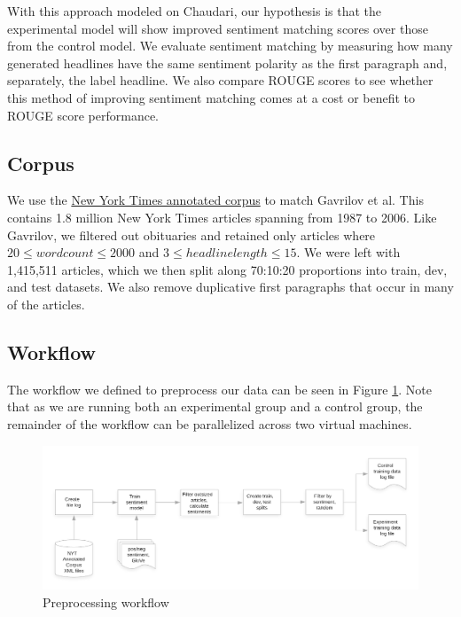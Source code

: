 \documentclass[11pt]{article}
\begin{document}
With this approach modeled on Chaudari\cite{DBLP:journals/corr/abs-1802-09426}, our hypothesis is that the experimental model will show improved sentiment matching scores over those from the control model. We evaluate sentiment matching by measuring how many generated headlines have the same sentiment polarity as the first paragraph and, separately, the label headline. We also compare ROUGE scores to see whether this method of improving sentiment matching comes at a cost or benefit to ROUGE score performance.

\subsection{Corpus}
We use the \href{https://catalog.ldc.upenn.edu/LDC2008T19}{New York Times annotated corpus} to match Gavrilov et al. This contains 1.8 million New York Times articles spanning from 1987 to 2006. Like Gavrilov, we filtered out obituaries and retained only articles where $20 \le wordcount \le 2000$ and $3 \le headline length \le 15$. We were left with 1,415,511 articles, which we then split along 70:10:20 proportions into train, dev, and test datasets. We also remove duplicative first paragraphs that occur in many of the articles. 

\subsection{Workflow}

The workflow we defined to preprocess our data can be seen in Figure \ref{figure:preprocess}. Note that as we are running both an experimental group and a control group, the remainder of the workflow can be parallelized across two virtual machines.

\begin{figure}
  \centering
  \includegraphics[width=\textwidth]{HeadGen_pre_p.png}
  \caption{Preprocessing workflow}
  \label{figure:preprocess}
\end{figure}
\end{document}

